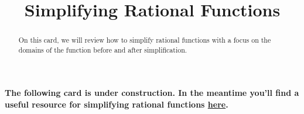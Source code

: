 \documentclass{ximera}
\title[Dig-In:]{Simplifying Rational Functions}
\begin{document}
\begin{abstract}
On this card, we will review how to simplify rational functions with a focus on the domains of the function before and after simplification. 
\end{abstract}
\maketitle

\textbf{The following card is under construction.  In the meantime you'll find a useful resource for simplifying rational functions \href{https://www.khanacademy.org/math/algebra2/rational-expressions-equations-and-functions/simplify-rational-expressions/a/intro-to-rational-expressions}{here}.}
\end{document}
